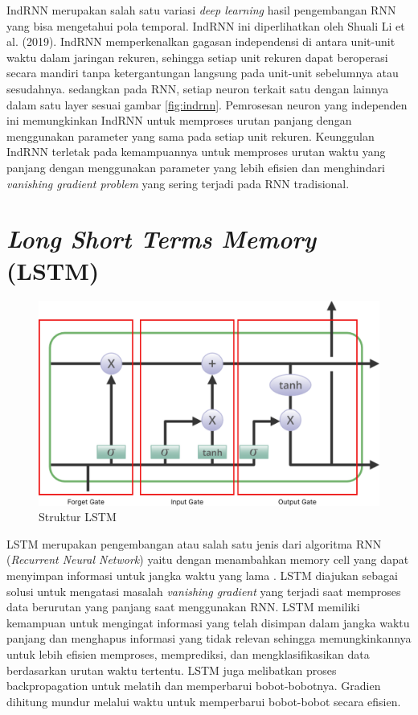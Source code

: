 IndRNN merupakan salah satu variasi \emph{deep learning} hasil pengembangan RNN yang bisa mengetahui pola temporal. IndRNN ini
diperlihatkan oleh Shuali Li et al. (2019). IndRNN memperkenalkan gagasan independensi di antara unit-unit waktu dalam jaringan rekuren,
sehingga setiap unit rekuren dapat beroperasi secara mandiri tanpa ketergantungan langsung pada unit-unit sebelumnya atau sesudahnya.
sedangkan pada RNN, setiap neuron terkait satu dengan lainnya dalam satu layer sesuai gambar \ref{fig:indrnn}. Pemrosesan neuron yang
independen ini memungkinkan IndRNN untuk memproses urutan panjang dengan menggunakan parameter yang sama pada setiap unit rekuren.
Keunggulan IndRNN terletak pada kemampuannya untuk memproses urutan waktu yang panjang dengan menggunakan parameter yang lebih efisien
dan menghindari \emph{vanishing gradient problem} yang sering terjadi pada RNN tradisional.



\section{\emph{Long Short Terms Memory} (LSTM)}

\begin{figure} [ht] \centering
  \includegraphics[scale=0.2]{gambar/LSTM.png}
  \caption{Struktur LSTM}
  \label{fig:LSTM}
\end{figure}

LSTM merupakan pengembangan atau salah satu jenis dari algoritma RNN
(\emph{Recurrent Neural Network}) yaitu dengan menambahkan memory cell yang dapat menyimpan
informasi untuk jangka waktu yang lama \parencite{26}. LSTM diajukan sebagai solusi
untuk mengatasi masalah \emph{vanishing gradient} yang terjadi saat memproses data berurutan
yang panjang saat menggunakan RNN. LSTM memiliki kemampuan untuk mengingat informasi
yang telah disimpan dalam jangka waktu panjang dan menghapus informasi yang tidak
relevan sehingga memungkinkannya untuk lebih efisien memproses, memprediksi, dan mengklasifikasikan
data berdasarkan urutan waktu tertentu. LSTM juga melibatkan proses backpropagation untuk melatih dan
memperbarui bobot-bobotnya. Gradien dihitung mundur melalui waktu untuk memperbarui bobot-bobot secara efisien.

